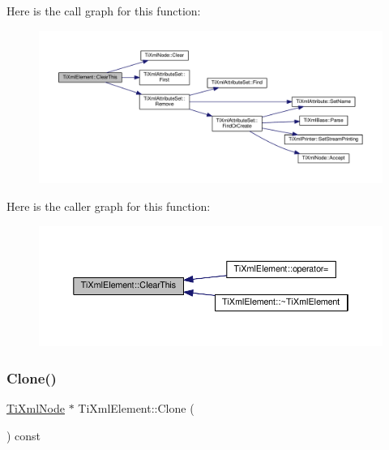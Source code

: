 Here is the call graph for this function\+:
\nopagebreak
\begin{figure}[H]
\begin{center}
\leavevmode
\includegraphics[width=350pt]{class_ti_xml_element_a5670933ec2d7d9763b9891acc05d7f7d_cgraph}
\end{center}
\end{figure}
Here is the caller graph for this function\+:
\nopagebreak
\begin{figure}[H]
\begin{center}
\leavevmode
\includegraphics[width=350pt]{class_ti_xml_element_a5670933ec2d7d9763b9891acc05d7f7d_icgraph}
\end{center}
\end{figure}
\mbox{\label{class_ti_xml_element_a810ea8fa40844c01334e5af2a26794cb}} 
\subsubsection{\texorpdfstring{Clone()}{Clone()}}
{\footnotesize\ttfamily \hyperlink{class_ti_xml_node}{Ti\+Xml\+Node} $\ast$ Ti\+Xml\+Element\+::\+Clone (\begin{DoxyParamCaption}{ }\end{DoxyParamCaption}) const\hspace{0.3cm}{\ttfamily [virtual]}}



